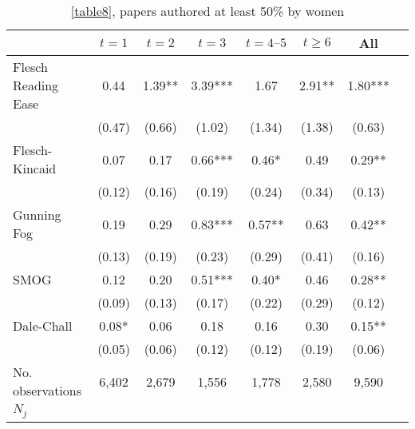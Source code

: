 \begin{table}[H]
    \footnotesize
    \centering
    \begin{threeparttable}
        \caption{\autoref{table8}, papers authored at least 50\% by women}
        \label{table8XB}
        \begin{tabular}{p{3cm}S@{}S@{}S@{}S@{}S@{}S@{}S@{}}
            \toprule
            &{\(t=1\)}&{\(t=2\)}&{\(t=3\)}&{\(t=4\text{--}5\)}&{\(t\ge6\)}&{All}\\
            \midrule
            Flesch Reading Ease           &        0.44   &        1.39** &        3.39***&        1.67   &        2.91** &        1.80***\\
                                          &      (0.47)   &      (0.66)   &      (1.02)   &      (1.34)   &      (1.38)   &      (0.63)   \\
            Flesch-Kincaid                &        0.07   &        0.17   &        0.66***&        0.46*  &        0.49   &        0.29** \\
                                          &      (0.12)   &      (0.16)   &      (0.19)   &      (0.24)   &      (0.34)   &      (0.13)   \\
            Gunning Fog                   &        0.19   &        0.29   &        0.83***&        0.57** &        0.63   &        0.42** \\
                                          &      (0.13)   &      (0.19)   &      (0.23)   &      (0.29)   &      (0.41)   &      (0.16)   \\
            SMOG                          &        0.12   &        0.20   &        0.51***&        0.40*  &        0.46   &        0.28** \\
                                          &      (0.09)   &      (0.13)   &      (0.17)   &      (0.22)   &      (0.29)   &      (0.12)   \\
            Dale-Chall                    &        0.08*  &        0.06   &        0.18   &        0.16   &        0.30   &        0.15** \\
                                          &      (0.05)   &      (0.06)   &      (0.12)   &      (0.12)   &      (0.19)   &      (0.06)   \\
            \midrule
            No. observations              &       6,402   &       2,679   &       1,556   &       1,778   &       2,580   &       9,590   \\
            \(N_j\)                       &           {}   &           {}   &           {}   &           {}   &           {}   &           {}   \\

\end{tabular}
\end{threeparttable}
\end{table}
